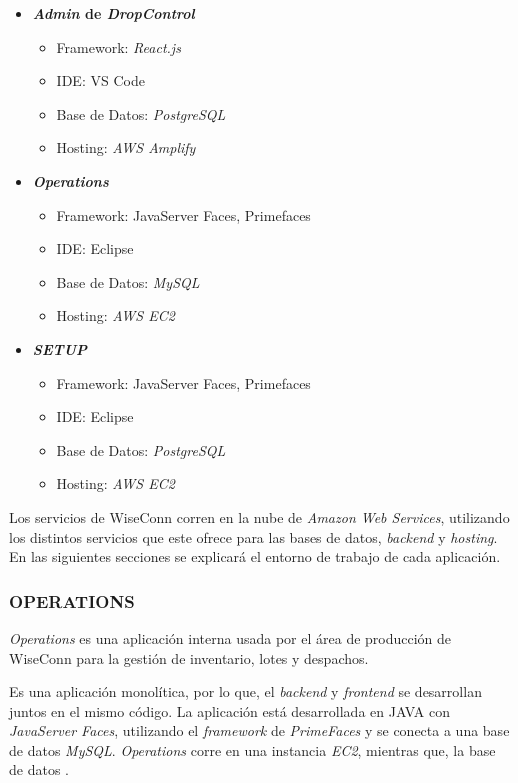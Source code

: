 \begin{itemize}
    \item \textbf{\textit{Admin} de \textit{DropControl}}
    \begin{itemize}
        \item Framework: \textit{React.js}
        \item IDE: VS Code
        \item Base de Datos: \textit{PostgreSQL}
        \item Hosting: \textit{AWS Amplify}
    \end{itemize}
    \item \textbf{\textit{Operations}}
    \begin{itemize}
        \item Framework: JavaServer Faces, Primefaces
        \item IDE: Eclipse
        \item Base de Datos: \textit{MySQL}
        \item Hosting: \textit{AWS EC2}
    \end{itemize}
    \item \textbf{\textit{SETUP}}
    \begin{itemize}
        \item Framework: JavaServer Faces, Primefaces
        \item IDE: Eclipse
        \item Base de Datos: \textit{PostgreSQL}
        \item Hosting: \textit{AWS EC2}
    \end{itemize}
\end{itemize}

\iffalse
Los servicios de WiseConn corren en la nube de \textit{Amazon Web Services}, utilizando los distintos servicios que este ofrece para las bases de datos, \textit{backend} y \textit{hosting}. En las siguientes secciones se explicará el entorno de trabajo de cada aplicación.

\subsubsection{OPERATIONS}

\textit{Operations} es una aplicación interna usada por el área de producción de WiseConn para la gestión de inventario, lotes y despachos.

Es una aplicación monolítica, por lo que, el \textit{backend} y \textit{frontend} se desarrollan juntos en el mismo código. La aplicación está desarrollada en JAVA con \textit{JavaServer Faces}, utilizando el \textit{framework} de \textit{PrimeFaces} y se conecta a una base de datos \textit{MySQL}. \textit{Operations} corre en una instancia \textit{EC2}, mientras que, la base de datos .\

